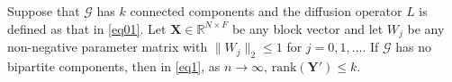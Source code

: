 \documentclass{article}
\newcommand\ie{\textit{i.e.}}
\newcommand\doubleP{\mathbb{P}}
\newenvironment{theorem}[2][Theorem]{\begin{trivlist}
		\item[\hskip \labelsep {\bfseries #1}\hskip \labelsep {\bfseries #2.}]}{\end{trivlist}}
\newenvironment{lemma}[2][Lemma]{\begin{trivlist}
		\item[\hskip \labelsep {\bfseries #1}\hskip \labelsep {\bfseries #2.}]}{\end{trivlist}}
\newenvironment{proof}{{\noindent\it Proof}\quad}{\hfill $\square$\par}
\begin{document}
\begin{appendices}

\begin{theorem} 1
Suppose that $\mathcal{G}$ has $k$ connected components and the diffusion operator $L$ is defined as that in \eqref{eq01}. Let $\bm{X} \in \mathbb{R}^{N \times F}$ be any block vector and let $W_j$ be any   non-negative parameter matrix with $\|W_j\|_2\leq 1$ for $j=0,1,\ldots$.
If $\mathcal{G}$ has no bipartite components, then in \eqref{eq1}, as $n \to \infty$, $\text{rank}(\bm{Y'}) \leq k$.
\end{theorem}	


\end{appendices}
\end{document}
